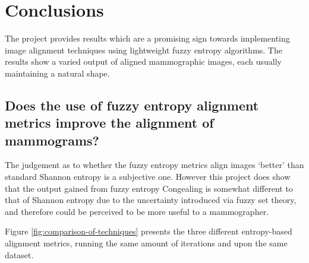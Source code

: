 \section{Conclusions}

The project provides results which are a promising sign towards implementing image alignment techniques using lightweight fuzzy entropy algorithms. The results show a varied output of aligned mammographic images, each usually maintaining a natural shape.

\subsection{Does the use of fuzzy entropy alignment metrics improve the alignment of mammograms?}

The judgement as to whether the fuzzy entropy metrics align images `better' than standard Shannon entropy is a subjective one. However this project does show that the output gained from fuzzy entropy \gls{Congealing} is somewhat different to that of Shannon entropy due to the uncertainty introduced via fuzzy set theory, and therefore could be perceived to be more useful to a mammographer.

Figure \ref{fig:comparison-of-techniques} presents the three different entropy-based alignment metrics, running the same amount of iterations and upon the same dataset.

